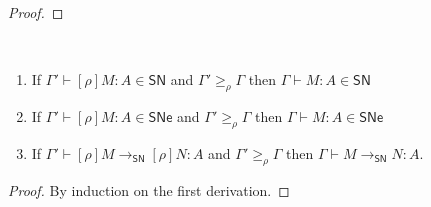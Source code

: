 \documentclass{article}
\newcommand{\ext}[1]{\geq_{#1}}
\newcommand{\SN}{\mathsf{SN}}
\newcommand{\SNe}{\mathsf{SNe}}
\newcommand{\redSN}{\longrightarrow_\SN}
\begin{document}
\begin{proof}
\end{proof}

\begin{lemma}~\label{lm:anti-renameSN}
  \begin{enumerate}
  \item If $\Gamma' \vdash [\rho]M : A \in \SN$ and $\Gamma' \ext{\rho} \Gamma$ then $\Gamma \vdash M : A \in \SN$
  \item If $\Gamma' \vdash [\rho]M : A \in \SNe$ and $\Gamma' \ext{\rho} \Gamma$ then $\Gamma \vdash M : A \in \SNe$
  \item If $\Gamma' \vdash [\rho]M \redSN [\rho]N : A$ and $\Gamma' \ext{\rho} \Gamma$ then $\Gamma \vdash M \redSN N : A$.
  \end{enumerate}
\end{lemma}
\begin{proof}
By induction on the first derivation.
\end{proof}




\end{document}
